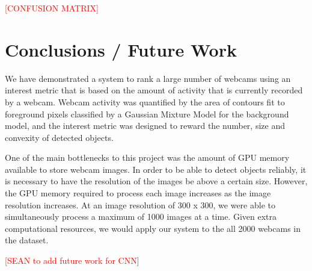 \documentclass[10pt]{article} %
\begin{document}
\textcolor{red}{[CONFUSION MATRIX]}


\section{Conclusions / Future Work}
We have demonstrated a system to rank a large number of webcams using an interest metric that is based on the amount of activity that is currently recorded by a webcam. Webcam activity was quantified by the area of contours fit to foreground pixels classified by a Gaussian Mixture Model for the background model, and the interest metric was designed to reward the number, size and convexity of detected objects. 

One of the main bottlenecks to this project was the amount of GPU memory available to store webcam images. In order to be able to detect objects reliably, it is necessary to have the resolution of the images be above a certain size. However, the GPU memory required to process each image increases as the image resolution increases. At an image resolution of 300 x 300, we were able to simultaneously process a maximum of 1000 images at a time. Given extra computational resources, we would apply our system to the all 2000 webcams in the dataset.

\textcolor{red}{[SEAN to add future work for CNN]}
\end{document}

